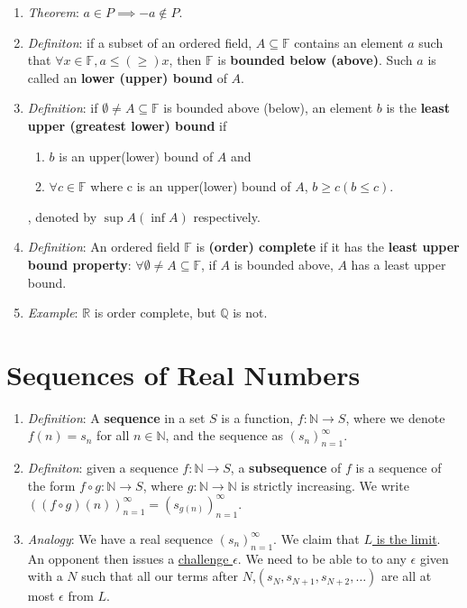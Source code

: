 \documentclass[10pt]{article}
\newcommand{\seqn}[1]{(#1)^\infty_{n=1}}
\begin{document}
\begin{multicols*}{3}
\begin{enumerate}
		\item \emph{Theorem}: $a\in P\implies-a\notin P$.
		\item \emph{Definiton}: if a subset of an ordered field, $A\subseteq\mathbb{F}$
		      contains an element
		      $a$ such that $\forall x\in \mathbb{F}, a\leq(\geq) x$, then
		      $\mathbb{F}$ is \textbf{bounded below (above)}. Such $a$ is called
		      an \textbf{lower (upper) bound} of $A$.

		\item \emph{Definition}: if $\emptyset\neq A\subseteq \mathbb{F}$ is
		      bounded above (below), an element $b$ is the \textbf{least upper
			      (greatest lower) bound} if
		      \begin{enumerate}
			      \item $b$ is an upper(lower) bound of $A$ and
			      \item $\forall c\in \mathbb{F}$ where c is an upper(lower) bound of
			            $A$, $b\geq c(b\leq c)$.
		      \end{enumerate}
		      , denoted by $\sup A(\inf A)$ respectively.
		\item \emph{Definition}: An ordered field $\mathbb{F}$ is \textbf{(order)
			      complete} if it has the \textbf{least upper bound property}:
		      $\forall \emptyset\neq A\subseteq\mathbb{F}$, if $A$ is bounded
		      above, $A$ has a least upper bound.
		\item \emph{Example}: $\mathbb{R}$ is order complete, but $\mathbb{Q}$
		      is not.
	\end{enumerate}

	\section{Sequences of Real Numbers}
	\begin{enumerate}
		\item \emph{Definition}: A \textbf{sequence} in a set $S$ is a function,
		      $f:\mathbb{N}\to S$, where we denote $f(n)=s_n$ for all $n\in
			      \mathbb{N}$, and the sequence as $\seqn{s_n}$.

		\item \emph{Definiton}: given a sequence $f:\mathbb{N}\to S$, a
		      \textbf{subsequence} of $f$ is a sequence of the form $f\circ
			      g:\mathbb{N}\to S$, where $g:\mathbb{N}\to\mathbb{N}$
		      is strictly increasing. We write $\seqn{(f\circ g)(n)}=\seqn{s_{g(n)}}$.
		\item \emph{Analogy}: We have a real sequence $\seqn{s_n}$. We claim
		      that \underline{$L$ is the limit}. An opponent then issues a
		      \underline{challenge $\epsilon$}. We need to be able to to any
		      $\epsilon$ given with a $N$ such that all our terms after $N$,$(s_N,
			      s_{N+1},s_{N+2},\dots)$ are all at most $\epsilon$ from $L$.


\end{enumerate}
\end{multicols*}
\end{document}
